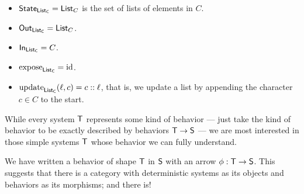 \documentclass[DynamicalBook]{subfiles}
\begin{document}
\begin{exercise}
\begin{enumerate}
    \begin{itemize}
      \item $\mathsf{State}_{\mathsf{List_C}} = \mathsf{List}_C$ is the set of lists of elements in
        $C$.
      \item $\mathsf{Out}_{\mathsf{List_C}} = \mathsf{List}_C$.
      \item $\mathsf{In}_{\mathsf{List_C}} = C$.
      \item $\mathrm{expose}_{\mathsf{List_C}} = \mathrm{id}$.
      \item $\mathrm{update}_{\mathsf{List_C}}(\ell, c) = c::\ell$, that is, we update a list by
        appending the character $c \in C$ to the start.
    \end{itemize}
  \end{enumerate}
\end{exercise}

While every system $\mathsf{T}$ represents some kind of behavior --- just take the kind of
behavior to be exactly described by behaviors $\mathsf{T} \to \mathsf{S}$ --- we are
most interested in those simple systems $\mathsf{T}$ whose behavior we can fully
understand. 


We have written a behavior of shape $\mathsf{T}$ in $\mathsf{S}$ with an arrow $\phi :
\mathsf{T} \to \mathsf{S}$. This suggests that there is a category with deterministic
systems as its objects and behaviors as its morphisms; and there is!
\end{document}
